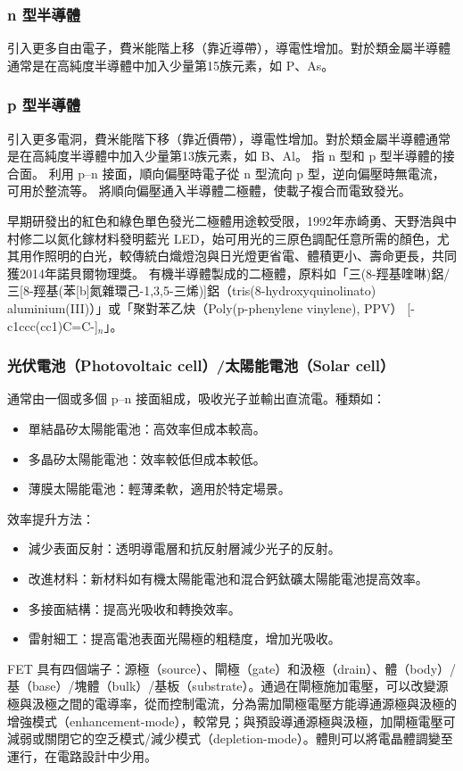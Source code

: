 \documentclass[a4paper,12pt]{report}
\begin{document}
\subsubsection{n 型半導體}
引入更多自由電子，費米能階上移（靠近導帶），導電性增加。對於類金屬半導體通常是在高純度半導體中加入少量第15族元素，如 P、As。
\subsubsection{p 型半導體}
引入更多電洞，費米能階下移（靠近價帶），導電性增加。對於類金屬半導體通常是在高純度半導體中加入少量第13族元素，如 B、Al。
指 n 型和 p 型半導體的接合面。
利用 p–n 接面，順向偏壓時電子從 n 型流向 p 型，逆向偏壓時無電流，可用於整流等。
將順向偏壓通入半導體二極體，使載子複合而電致發光。

早期研發出的紅色和綠色單色發光二極體用途較受限，1992年赤崎勇、天野浩與中村修二以氮化鎵材料發明藍光 LED，始可用光的三原色調配任意所需的顏色，尤其用作照明的白光，較傳統白熾燈泡與日光燈更省電、體積更小、壽命更長，共同獲2014年諾貝爾物理獎。
有機半導體製成的二極體，原料如「三(8-羥基喹啉)鋁/三[8-羥基(苯[b]氮雜環己-1,3,5-三烯)]鋁（tris(8-hydroxyquinolinato) aluminium(III)）」或「聚對苯乙炔（Poly(p-phenylene vinylene), PPV） [-c1ccc(cc1)C=C-]$_n$」。
\subsubsection{光伏電池（Photovoltaic cell）/太陽能電池（Solar cell）}
通常由一個或多個 p–n 接面組成，吸收光子並輸出直流電。種類如：
\begin{itemize}
\item 單結晶矽太陽能電池：高效率但成本較高。
\item 多晶矽太陽能電池：效率較低但成本較低。
\item 薄膜太陽能電池：輕薄柔軟，適用於特定場景。
\end{itemize}
效率提升方法：
\begin{itemize}
\item 減少表面反射：透明導電層和抗反射層減少光子的反射。
\item 改進材料：新材料如有機太陽能電池和混合鈣鈦礦太陽能電池提高效率。
\item 多接面結構：提高光吸收和轉換效率。
\item 雷射細工：提高電池表面光陽極的粗糙度，增加光吸收。
\end{itemize}
FET 具有四個端子：源極（source）、閘極（gate）和汲極（drain）、體（body）/基（base）/塊體（bulk）/基板（substrate）。通過在閘極施加電壓，可以改變源極與汲極之間的電導率，從而控制電流，分為需加閘極電壓方能導通源極與汲極的增強模式（enhancement-mode），較常見；與預設導通源極與汲極，加閘極電壓可減弱或關閉它的空乏模式/減少模式（depletion-mode）。體則可以將電晶體調變至運行，在電路設計中少用。
\end{document}
